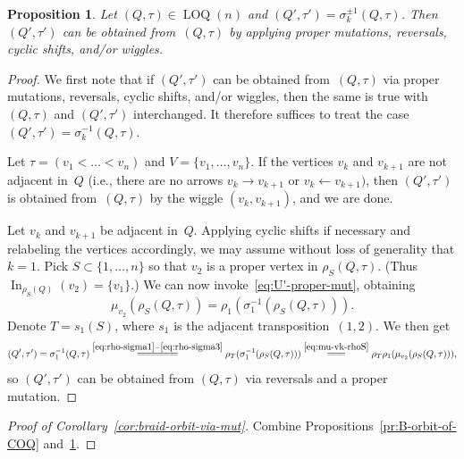 \documentclass[11pt, letterpaper]{amsart}
\newtheorem{proposition}[theorem]{Proposition}
\theoremstyle{definition}
\numberwithin{equation}{section}
\def\In{{\operatorname{In}}}
\newcommand\LOQ{\operatorname{LOQ}}
\begin{document}
\begin{proposition}
\label{pr:bondal is mutation reversal}
Let $(Q,\tau)\in\LOQ(n)$ and $(Q',\tau')=\sigma^{\pm1}_k(Q,\tau)$. %
Then $(Q',\tau')$ can be obtained from~$(Q,\tau)$ by applying proper mutations, reversals, cyclic shifts, and/or wiggles. 
\end{proposition}

\begin{proof}
We first note that if $(Q',\tau')$ can be obtained from~$(Q,\tau)$ via 
proper mutations, reversals, cyclic shifts, and/or wiggles,
then the same is true with $(Q,\tau)$ and $(Q',\tau')$ interchanged. 
%
It therefore suffices to treat the case $(Q',\tau')=\sigma^{-1}_k(Q,\tau)$. 

Let $\tau=(v_1<\dots<v_n)$ and $V=\{v_1,\dots,v_n\}$. 
If the vertices $v_k$ and $v_{k+1}$ are not adjacent in~$Q$ 
(i.e., there are no arrows $v_k\to v_{k+1}$ or ${v_k\leftarrow v_{k+1})}$, 
then $(Q',\tau')$ is obtained from~$(Q,\tau)$ by the wiggle $(v_k, v_{k+1})$, and we are done. 

Let $v_k$ and $v_{k+1}$ be adjacent in~$Q$. 
Applying cyclic shifts if necessary and relabeling the vertices accordingly, 
we may assume without loss of generality that $k=1$.
Pick $S\subset\{1,\dots,n\}$ so that $v_2$ is a proper vertex in $\rho_S(Q,\tau)$. 
(Thus $\In_{\rho_S(Q)}(v_2) = \{v_{1}\}$.) 
%
We can now invoke~\eqref{eq:U'-proper-mut}, obtaining  
\begin{equation}
\label{eq:mu-vk-rhoS}
\mu_{v_2} (\rho_S(Q,\tau)) = \rho_{1}(\sigma^{-1}_1(\rho_S(Q,\tau))).
\end{equation}
Denote $T=s_1(S)$, where $s_1$ is the adjacent transposition~$(1,2)$.
We then get 
\begin{equation*}
(Q',\tau')
=\sigma^{-1}_1(Q,\tau) 
\stackrel{\eqref{eq:rho-sigma1}-\eqref{eq:rho-sigma3}}{=\joinrel=\joinrel=\joinrel=\joinrel=\joinrel=\joinrel=} \rho_{T}(\sigma^{-1}_1(\rho_S(Q,\tau))) 
\stackrel{\ref{eq:mu-vk-rhoS}}{=\joinrel=\joinrel=} \rho_{T} \rho_{1} ( \mu_{v_2} (\rho_S(Q,\tau))),
\end{equation*}
so $(Q',\tau')$ can be obtained from $(Q,\tau)$ via reversals and a proper mutation. 
\end{proof}

\begin{proof}[Proof of Corollary~\ref{cor:braid-orbit-via-mut}]
Combine Propositions~\ref{pr:B-orbit-of-COQ} and~\ref{pr:bondal is mutation reversal}.
\end{proof}
\end{document}

